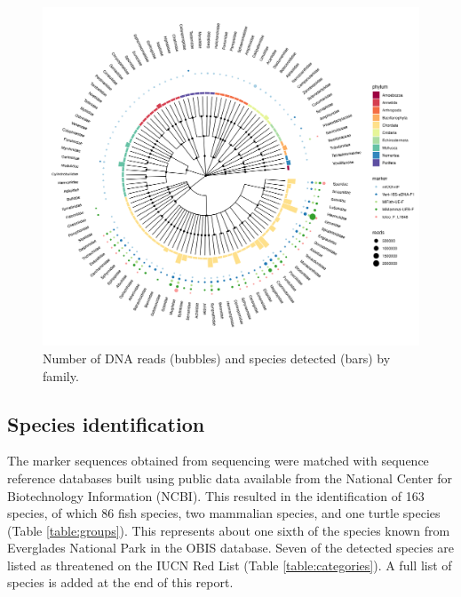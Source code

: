 \documentclass[10pt]{article}
\begin{document}
\begin{figure}[h!]
\centering
\includegraphics[width=\textwidth]{tree}
\caption{Number of DNA reads (bubbles) and species detected (bars) by family.}
\label{fig:tree}
\end{figure}

\clearpage

\subsection*{Species identification}

\begin{multicols}{2}
The marker sequences obtained from sequencing were matched with sequence reference databases built using public data available from the National Center for Biotechnology Information (NCBI). This resulted in the identification of 163 species, of which 86 fish species, two mammalian species, and one turtle species (Table \ref{table:groups}). This represents about one sixth of the species known from Everglades National Park in the OBIS database. Seven of the detected species are listed as threatened on the IUCN Red List (Table \ref{table:categories}). A full list of species is added at the end of this report.
\end{multicols}





\clearpage
\end{document}
